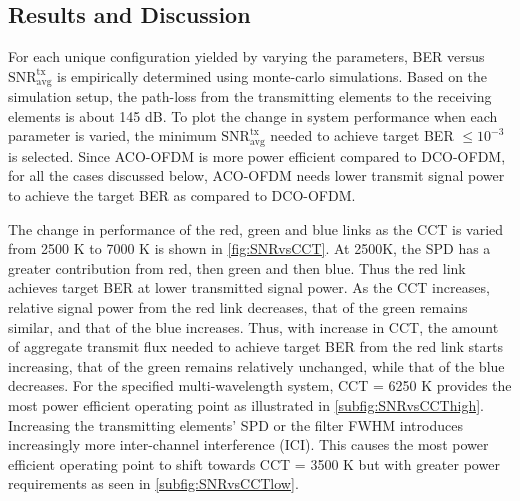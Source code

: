 

\subsection{Results and Discussion}
\label{subsec:wdmSystemResults}
For each unique configuration yielded by varying the parameters, BER versus $\text{SNR}^{\text{tx}}_{\text{avg}}$ is empirically determined using monte-carlo simulations. Based on the simulation setup, the path-loss from the transmitting elements to the receiving elements is about 145 dB. To plot the change in system performance when each parameter is varied, the minimum $\text{SNR}^{\text{tx}}_{\text{avg}}$ needed to achieve target BER $\leq 10^{-3}$ is selected. Since ACO-OFDM is more power efficient compared to DCO-OFDM, for all the cases discussed below, ACO-OFDM needs lower transmit signal power to achieve the target BER as compared to DCO-OFDM.

The change in performance of the red, green and blue links as the CCT is varied from 2500 K to 7000 K is shown in \figurename{\ref{fig:SNRvsCCT}}. At 2500K, the SPD has a greater contribution from red, then green and then blue. Thus the red link achieves target BER at lower transmitted signal power. As the CCT increases, relative signal power from the red link decreases, that of the green remains similar, and that of the blue increases. Thus, with increase in CCT, the amount of aggregate transmit flux needed to achieve target BER from the red link starts increasing, that of the green remains relatively unchanged, while that of the blue decreases. For the specified multi-wavelength system, CCT = 6250 K provides the most power efficient operating point as illustrated in \figurename{\ref{subfig:SNRvsCCThigh}}. Increasing the transmitting elements' SPD or the filter FWHM introduces increasingly more inter-channel interference (ICI). This causes the most power efficient operating point to shift towards CCT = 3500 K but with greater power requirements as seen in \figurename{\ref{subfig:SNRvsCCTlow}}.

